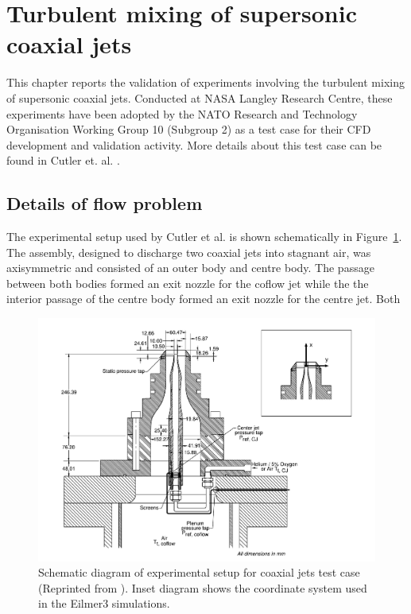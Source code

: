 
\newpage
\section{Turbulent mixing of supersonic coaxial jets}
\label{chapter-coaxial-jets}
%
This chapter reports the validation of experiments involving the 
turbulent mixing of supersonic coaxial jets. Conducted at NASA 
Langley Research Centre, these experiments have been adopted by
the NATO Research and Technology Organisation Working Group 10 
(Subgroup 2) as a test case for their CFD development and validation
activity. More details about this test case can be found in Cutler et. al. \cite{Cutler2006}.

\subsection{Details of flow problem}
%
The experimental setup used by Cutler et al. is shown 
schematically in Figure~\ref{figure-coaxial-jets-exp-setup}.
The assembly, designed to discharge two coaxial jets into 
stagnant air, was axisymmetric and consisted of an outer
body and centre body. The passage between both bodies formed
an exit nozzle for the coflow jet while the the interior passage
of the centre body formed an exit nozzle for the centre jet. Both 
%
\begin{figure}[htbp]
\begin{center}
\includegraphics[width=15cm]{./chap5-coaxial-jets/figs/facility1-test.pdf}
\end{center}
\caption{Schematic diagram of experimental setup for coaxial jets test 
         case (Reprinted from \cite{Cutler2006}). Inset diagram 
         shows the coordinate system used in the Eilmer3 simulations.}
\label{figure-coaxial-jets-exp-setup}
\end{figure}
